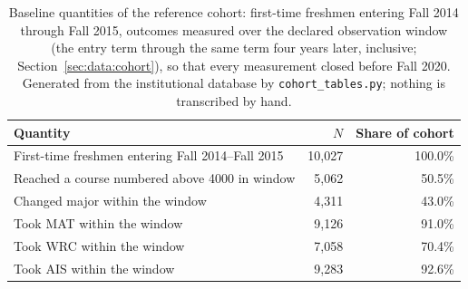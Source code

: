 \begin{table}[tbp]
  \centering
  \caption{Baseline quantities of the reference cohort: first-time freshmen entering Fall 2014 through Fall 2015, outcomes measured over the declared observation window (the entry term through the same term four years later, inclusive; Section~\ref{sec:data:cohort}), so that every measurement closed before Fall 2020. Generated from the institutional database by \texttt{cohort\_tables.py}; nothing is transcribed by hand.}
  \label{tab:cohortbaseline}
  \begin{tabular}{@{}lrr@{}}
    \toprule
    Quantity & $N$ & Share of cohort \\
    \midrule
    First-time freshmen entering Fall 2014--Fall 2015 & 10,027 & 100.0\% \\
    Reached a course numbered above 4000 in window & 5,062 & 50.5\% \\
    Changed major within the window & 4,311 & 43.0\% \\
    Took MAT within the window & 9,126 & 91.0\% \\
    Took WRC within the window & 7,058 & 70.4\% \\
    Took AIS within the window & 9,283 & 92.6\% \\
    \bottomrule
  \end{tabular}
\end{table}
